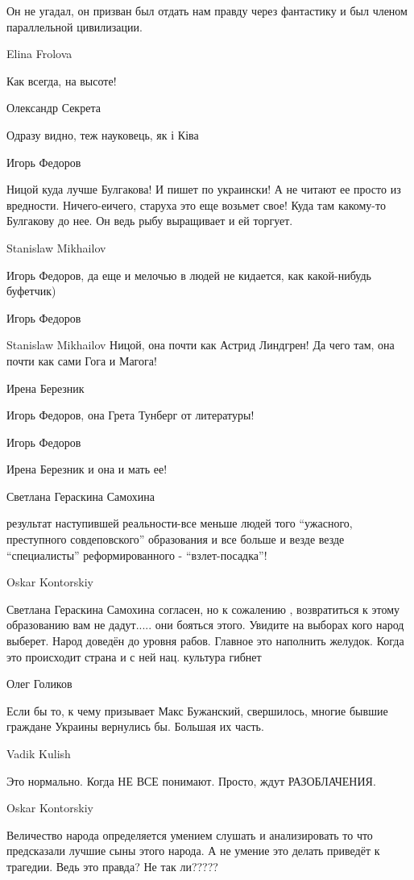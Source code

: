 Он не угадал, он призван был отдать нам правду через фантастику и был членом
параллельной цивилизации.

Elina Frolova

Как всегда, на высоте!

Олександр Секрета

Одразу видно, теж науковець, як і Ківа

Игорь Федоров

Ницой куда лучше Булгакова! И пишет по украински! А не читают ее просто из
вредности. Ничего-еичего, старуха это еще возьмет свое! Куда там какому-то
Булгакову до нее. Он ведь рыбу выращивает и ей торгует.

Stanislaw Mikhailov

Игорь Федоров, да еще и мелочью в людей не кидается, как какой-нибудь буфетчик)

Игорь Федоров

Stanislaw Mikhailov Ницой, она почти как Астрид Линдгрен! Да чего там, она
почти как сами Гога и Магога!

Ирена Березник

Игорь Федоров, она Грета Тунберг от литературы!

Игорь Федоров

Ирена Березник и она и мать ее!

Светлана Гераскина Самохина

результат наступившей реальности-все меньше людей того \enquote{ужасного, преступного
совдеповского} образования и все больше и везде везде \enquote{специалисты}
реформированного - \enquote{взлет-посадка}!

Oskar Kontorskiy

Светлана Гераскина Самохина согласен, но к сожалению , возвратиться к этому
образованию вам не дадут..... они бояться этого. Увидите на выборах кого народ
выберет. Народ доведён до уровня рабов. Главное это наполнить желудок. Когда
это происходит страна и с ней нац. культура гибнет

Олег Голиков

Если бы то, к чему призывает Макс Бужанский, свершилось, многие бывшие граждане
Украины вернулись бы. Большая их часть.

Vadik Kulish

Это нормально. Когда НЕ ВСЕ понимают. Просто, ждут РАЗОБЛАЧЕНИЯ.

Oskar Kontorskiy

Величество народа определяется умением слушать и анализировать то что
предсказали лучшие сыны этого народа. А не умение это делать приведёт к
трагедии. Ведь это правда? Не так ли?????

